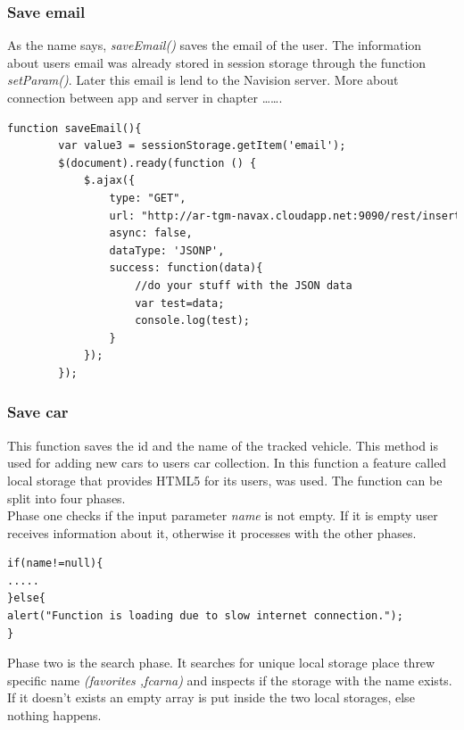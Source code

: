 \subsubsection{Save email}
As the name says, \textit{saveEmail()} saves the email of the user. The information about users email was already stored in session storage through the function \textit{setParam()}. Later this email is lend to the Navision server. More about connection between app and server in chapter …….
\\

\begin{lstlisting}[language=html, caption= 
Save email function,captionpos=b]
function saveEmail(){    
        var value3 = sessionStorage.getItem('email');
        $(document).ready(function () {
            $.ajax({
                type: "GET",
                url: "http://ar-tgm-navax.cloudapp.net:9090/rest/insertAndroidEmail/"+value3+"/ac73f229f1fb88a8719e5f6d295bee45?callback=?",
                async: false,
                dataType: 'JSONP',
                success: function(data){
                    //do your stuff with the JSON data
                    var test=data;
                    console.log(test);
                }
            });
        });
\end{lstlisting}

\subsubsection{Save car}
This function saves the id and the name of the tracked vehicle. This method is used for adding new cars to users car collection. In this function a feature called local storage that provides HTML5 for its users, was used. The function can be split into four phases.
\\

Phase one checks if the input parameter \textit{name} is not empty. If it is empty user receives information about it, otherwise it processes with the other phases.

\begin{lstlisting}[language=html, caption= 
Phase one,captionpos=b]
if(name!=null){
.....
}else{
alert("Function is loading due to slow internet connection.");
}
\end{lstlisting}

Phase two is the search phase. It searches for unique local storage place threw specific name \textit{(favorites ,fcarna)} and inspects if the storage with the name exists. If it doesn't exists an empty array is put inside the two local storages, else nothing happens.
\\

